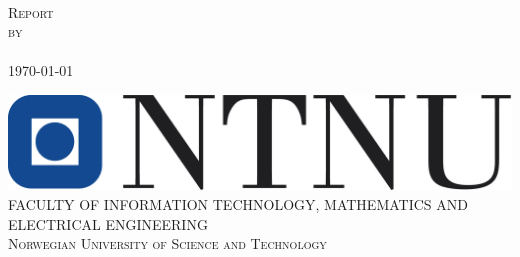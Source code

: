\begin{titlepage}
\thispagestyle{empty}
\centering
\textsc{\MyFag{}} \\[4cm]
\textsc{\LARGE Report} \\[1cm]
\textsc{\Huge \MyTitle{}}
\textsc{by} \\
\textsc{\MyAuthor{}} \\[2cm]
\textsc{\large \today}

\begin{flushbottom}
\vfill
\includegraphics[scale=0.5]{img/ntnu} \\[0.5cm]
\textsc{\small FACULTY OF INFORMATION TECHNOLOGY, MATHEMATICS AND ELECTRICAL ENGINEERING \\ Norwegian University of Science and Technology}
\end{flushbottom}
\end{titlepage}